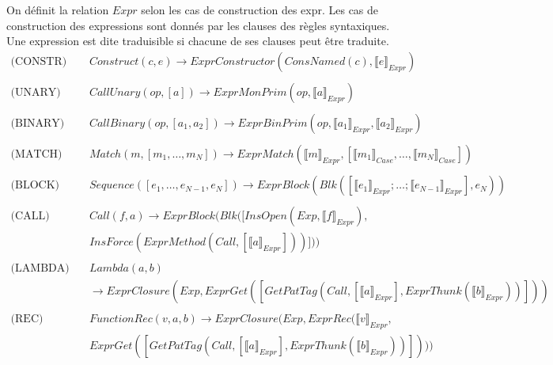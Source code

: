 \documentclass[
  12pt,
]{article}
\begin{document}
On définit la relation \({Expr}\) selon les cas de construction
des expr. Les cas de construction des expressions sont donnés par les
clauses des règles syntaxiques. Une expression est dite traduisible si
chacune de ses clauses peut être traduite. \begin{align*}
    \text{(CONSTR)} \quad &  Construct(c,e) \rightarrow  ExprConstructor(ConsNamed(c), \llbracket e \rrbracket_{Expr})                                             \\
  \\
  \text{(UNARY)} \quad & CallUnary(op, [a]) \rightarrow  ExprMonPrim(op, \llbracket a \rrbracket_{Expr}) \\
  \\
  \text{(BINARY)} \quad &  CallBinary(op, [a_1,a_2]) \rightarrow  ExprBinPrim(op, \llbracket a_1 \rrbracket_{Expr}, \llbracket a_2 \rrbracket_{Expr})                                            \\                                    \\
  \text{(MATCH)} \quad  &  Match(m,[m_1,\dots,m_N]) \rightarrow  ExprMatch(\llbracket m \rrbracket_{Expr}, [\llbracket m_1 \rrbracket_{Case},\dots,\llbracket m_N \rrbracket_{Case}])                                        \\
  \\
  \text{(BLOCK)} \quad  & Sequence([e_1,\dots,e_{N-1}, e_N])                                    
\rightarrow  ExprBlock(Blk([\llbracket e_1 \rrbracket_{Expr}; \dots ; \llbracket e_{N-1} \rrbracket_{Expr}], e_N))                                      \\
  \\
  \text{(CALL)} \quad & Call(f, a)                                                 \rightarrow  ExprBlock(Blk([InsOpen(Exp, \llbracket f \rrbracket_{Expr} ), \\ & InsForce(ExprMethod(Call, [\llbracket a \rrbracket_{Expr}]))]))                                       \\
  \\
  \text{(LAMBDA)} \quad  &  Lambda(a, b)                                                                                              \\
                               & \rightarrow  ExprClosure(Exp, ExprGet([GetPatTag(Call, [\llbracket a \rrbracket_{Expr}], ExprThunk(\llbracket b \rrbracket_{Expr}))]))                                          \\
  \\
  \text{(REC)} \quad                  &  FunctionRec(v, a, b)                                      
                                \rightarrow  ExprClosure(Exp,ExprRec(\llbracket v \rrbracket_{Expr}, \\  & ExprGet([GetPatTag(Call, [\llbracket a \rrbracket_{Expr}], ExprThunk(\llbracket b \rrbracket_{Expr}))]))) 
\end{align*}
\end{document}

